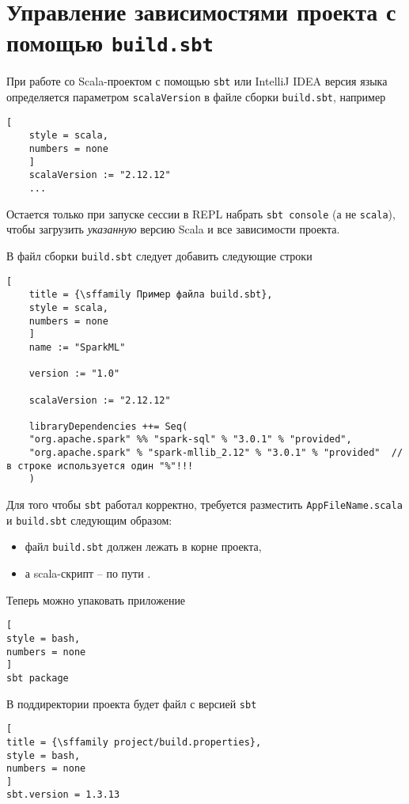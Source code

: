 \documentclass[%
	11pt,
	a4paper,
	utf8,
		]{article}
\begin{document}
\section{Управление зависимостями проекта с помощью \texttt{build.sbt}}

При работе со Scala-проектом с помощью \texttt{sbt} или IntelliJ IDEA версия языка определяется параметром \texttt{scalaVersion} в файле сборки \texttt{build.sbt}, например
\begin{lstlisting}[
	style = scala,
	numbers = none	
	]
	scalaVersion := "2.12.12"
	...
\end{lstlisting}

Остается только при запуске сессии в REPL набрать \texttt{sbt console} (а не \texttt{scala}), чтобы загрузить \emph{указанную} версию Scala и все зависимости проекта.

В файл сборки \texttt{build.sbt} следует добавить следующие строки
\begin{lstlisting}[
	title = {\sffamily Пример файла build.sbt},
	style = scala,
	numbers = none	
	]
	name := "SparkML"
	
	version := "1.0"
	
	scalaVersion := "2.12.12"
	
	libraryDependencies ++= Seq(
	"org.apache.spark" %% "spark-sql" % "3.0.1" % "provided",
	"org.apache.spark" % "spark-mllib_2.12" % "3.0.1" % "provided"  // в строке используется один "%"!!!
	)
\end{lstlisting}

Для того чтобы \texttt{sbt} работал корректно, требуется разместить \texttt{AppFileName.scala} и \texttt{build.sbt} следующим образом:
\begin{itemize}
	\item файл \texttt{build.sbt} должен лежать в корне проекта,
	
	\item а scala-скрипт -- по пути .
\end{itemize}

Теперь можно упаковать приложение
\begin{lstlisting}[
style = bash,
numbers = none	
]
sbt package
\end{lstlisting}

В поддиректории  проекта будет файл с версией \texttt{sbt}
\begin{lstlisting}[
title = {\sffamily project/build.properties},
style = bash,
numbers = none	
]
sbt.version = 1.3.13
\end{lstlisting}
\end{document}
